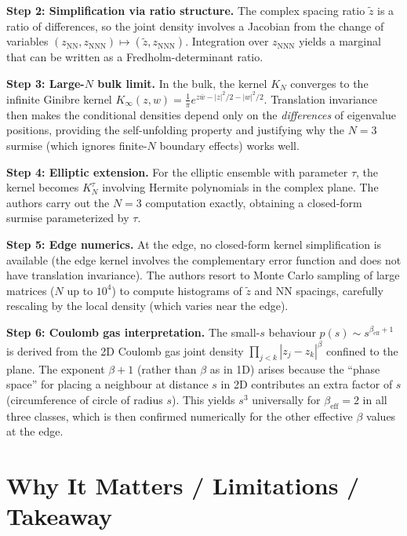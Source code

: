 \documentclass[11pt,a4paper]{article}
\theoremstyle{definition}
\begin{document}
\textbf{Step 2: Simplification via ratio structure.}
The complex spacing ratio $\tilde{z}$ is a ratio of differences, so the joint density involves a Jacobian from the change of variables $(z_{\mathrm{NN}}, z_{\mathrm{NNN}}) \mapsto (\tilde{z}, z_{\mathrm{NNN}})$.
Integration over $z_{\mathrm{NNN}}$ yields a marginal that can be written as a Fredholm-determinant ratio.

\textbf{Step 3: Large-$N$ bulk limit.}
In the bulk, the kernel $K_N$ converges to the infinite Ginibre kernel $K_\infty(z,w) = \frac{1}{\pi} e^{z\bar w - |z|^2/2 - |w|^2/2}$.
Translation invariance then makes the conditional densities depend only on the \emph{differences} of eigenvalue positions, providing the self-unfolding property and justifying why the $N=3$ surmise (which ignores finite-$N$ boundary effects) works well.

\textbf{Step 4: Elliptic extension.}
For the elliptic ensemble with parameter $\tau$, the kernel becomes $K_N^\tau$ involving Hermite polynomials in the complex plane.
The authors carry out the $N=3$ computation exactly, obtaining a closed-form surmise parameterized by $\tau$.

\textbf{Step 5: Edge numerics.}
At the edge, no closed-form kernel simplification is available (the edge kernel involves the complementary error function and does not have translation invariance).
The authors resort to Monte Carlo sampling of large matrices ($N$ up to $10^4$) to compute histograms of $\tilde{z}$ and NN spacings, carefully rescaling by the local density (which varies near the edge).

\textbf{Step 6: Coulomb gas interpretation.}
The small-$s$ behaviour $p(s)\sim s^{\beta_{\mathrm{eff}}+1}$ is derived from the 2D Coulomb gas joint density $\prod_{j<k} |z_j - z_k|^{\beta}$ confined to the plane.
The exponent $\beta+1$ (rather than $\beta$ as in 1D) arises because the ``phase space'' for placing a neighbour at distance $s$ in 2D contributes an extra factor of $s$ (circumference of circle of radius $s$).
This yields $s^3$ universally for $\beta_{\mathrm{eff}}=2$ in all three classes, which is then confirmed numerically for the other effective $\beta$ values at the edge.

\section{Why It Matters / Limitations / Takeaway}
\end{document}
